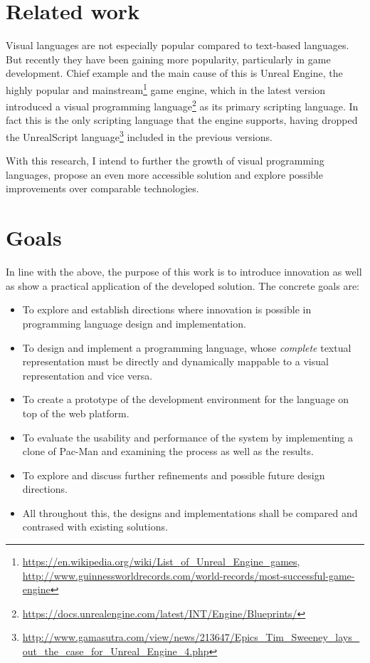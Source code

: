 \section{Related work}
Visual languages are not especially popular compared to text-based languages. But recently they have been gaining more popularity, particularly in game development. Chief example and the main cause of this is Unreal Engine, the highly popular and mainstream\footnote{\url{https://en.wikipedia.org/wiki/List_of_Unreal_Engine_games}, \url{http://www.guinnessworldrecords.com/world-records/most-successful-game-engine}} game engine, which in the latest version introduced a visual programming language\footnote{\url{https://docs.unrealengine.com/latest/INT/Engine/Blueprints/}} as its primary scripting language. In fact this is the only scripting language that the engine supports, having dropped the UnrealScript language\footnote{\url{http://www.gamasutra.com/view/news/213647/Epics_Tim_Sweeney_lays_out_the_case_for_Unreal_Engine_4.php}} included in the previous versions. 

With this research, I intend to further the growth of visual programming languages, propose an even more accessible solution and explore possible improvements over comparable technologies.

\section{Goals}
In line with the above, the purpose of this work is to introduce innovation as well as show a practical application of the developed solution. The concrete goals are:
\begin{itemize}
	\item To explore and establish directions where innovation is possible in programming language design and implementation.
	\item To design and implement a programming language, whose \textit{complete} textual representation must be directly and dynamically mappable to a visual representation and vice versa.
	\item To create a prototype of the development environment for the language on top of the web platform.
	\item To evaluate the usability and performance of the system by implementing a clone of Pac-Man and examining the process as well as the results.
	\item To explore and discuss further refinements and possible future design directions.
	\item All throughout this, the designs and implementations shall be compared and contrased with existing solutions.
\end{itemize}

